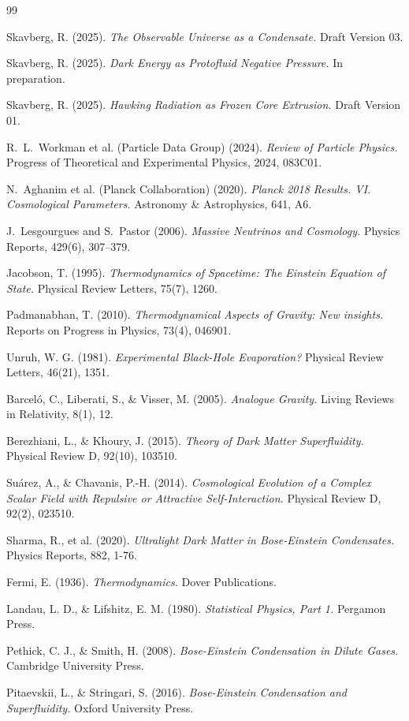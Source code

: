 \documentclass[11pt,a4paper]{article}
\theoremstyle{definition}
\theoremstyle{remark}
\begin{document}
\begin{thebibliography}{99}

Skavberg, R. (2025).
\textit{The Observable Universe as a Condensate.}
Draft Version 03.

Skavberg, R. (2025).
\textit{Dark Energy as Protofluid Negative Pressure.}
In preparation.

Skavberg, R. (2025).
\textit{Hawking Radiation as Frozen Core Extrusion.}
Draft Version 01.

R.~L.~Workman et al. (Particle Data Group) (2024).
\textit{Review of Particle Physics.}
Progress of Theoretical and Experimental Physics, 2024, 083C01.

N.~Aghanim et al. (Planck Collaboration) (2020).
\textit{Planck 2018 Results. VI. Cosmological Parameters.}
Astronomy \& Astrophysics, 641, A6.

J.~Lesgourgues and S.~Pastor (2006).
\textit{Massive Neutrinos and Cosmology.}
Physics Reports, 429(6), 307--379.

Jacobson, T. (1995).
\textit{Thermodynamics of Spacetime: The Einstein Equation of State.}
Physical Review Letters, 75(7), 1260.

Padmanabhan, T. (2010).
\textit{Thermodynamical Aspects of Gravity: New insights.}
Reports on Progress in Physics, 73(4), 046901.

Unruh, W. G. (1981).
\textit{Experimental Black-Hole Evaporation?}
Physical Review Letters, 46(21), 1351.

Barceló, C., Liberati, S., \& Visser, M. (2005).
\textit{Analogue Gravity.}
Living Reviews in Relativity, 8(1), 12.

Berezhiani, L., \& Khoury, J. (2015).
\textit{Theory of Dark Matter Superfluidity.}
Physical Review D, 92(10), 103510.

Suárez, A., \& Chavanis, P.-H. (2014).
\textit{Cosmological Evolution of a Complex Scalar Field with Repulsive or Attractive Self-Interaction.}
Physical Review D, 92(2), 023510.

Sharma, R., et al. (2020).
\textit{Ultralight Dark Matter in Bose-Einstein Condensates.}
Physics Reports, 882, 1-76.

Fermi, E. (1936).
\textit{Thermodynamics.}
Dover Publications.

Landau, L. D., \& Lifshitz, E. M. (1980).
\textit{Statistical Physics, Part 1.}
Pergamon Press.

Pethick, C. J., \& Smith, H. (2008).
\textit{Bose-Einstein Condensation in Dilute Gases.}
Cambridge University Press.

Pitaevskii, L., \& Stringari, S. (2016).
\textit{Bose-Einstein Condensation and Superfluidity.}
Oxford University Press.

\end{thebibliography}
\end{document}
